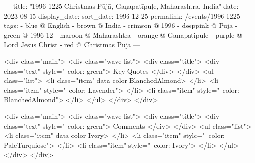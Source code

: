 ---
title: "1996-1225 Christmas Pūjā, Gaṇapatīpuḷe, Maharashtra, India"
date: 2023-08-15
display_date: 
sort_date: 1996-12-25
permalink: /events/1996-1225
tags:
  - blue @ English
  - brown @ India
  - crimson @ 1996
  - deeppink @ Puja
  - green @ 1996-12
  - maroon @ Maharashtra
  - orange @ Ganapatipule
  - purple @ Lord Jesus Christ
  - red @ Christmas Puja
---

<div class="main">
  <div class="wave-list">
    <div class="title">
      <div class="text" style="--color: green">
        Key Quotes
      </div>
    </div>
    <ul class="list">
        <li class="item" data-color-BlanchedAlmond>
        </li>
        <li class="item" style="--color: Lavender">
        </li>
        <li class="item" style="--color: BlanchedAlmond">
        </li>
      </ul>
  </div>
</div>

<div class="main">
  <div class="wave-list">
    <div class="title">
      <div class="text" style="--color: green">
        Comments
      </div>
    </div>
    <ul class="list">
        <li class="item" data-color-Ivory>
        </li>
        <li class="item" style="--color: PaleTurquiose">
        </li>
        <li class="item" style="--color: Ivory">
        </li>
      </ul>
  </div>
</div>